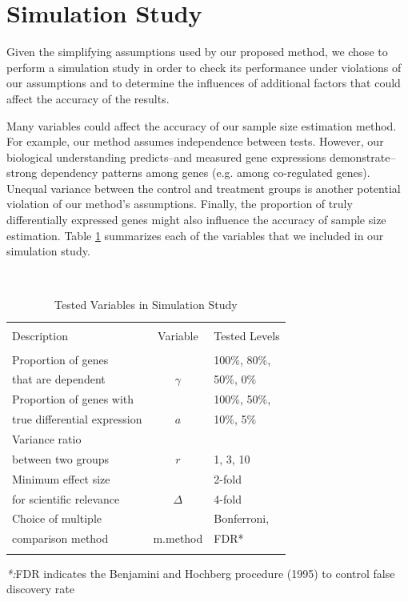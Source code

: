 \documentclass{bioinfo}
\begin{document}
\section{Simulation Study}

Given the simplifying assumptions used by our proposed method, we
chose to perform a simulation study in order to check its
performance under violations of our assumptions and to determine the
influences of additional factors that could affect the accuracy of
the results.

Many variables could affect the accuracy of our sample size
estimation method. For example, our method assumes independence
between tests. However, our biological understanding predicts--and
measured gene expressions demonstrate--strong dependency patterns
among genes (e.g. among co-regulated genes).  Unequal variance
between the control and treatment groups is another potential
violation of our method's assumptions. Finally, the proportion of
truly differentially expressed genes might also influence the
accuracy of sample size estimation.  Table
\ref{tb:SimuVariables} summarizes each of the variables that we
included in our simulation study.

\begin{table}\centering
  \caption{Tested Variables in Simulation Study}\ \\
  \begin{tabular}{lcl}
    \hline\hline
    \\
    Description & Variable & Tested Levels \\
    \\
    \hline\hline
    Proportion of genes &          & 100\%, 80\%,  \\
    that are dependent  & $\gamma$ & 50\%,   0\%    \\
    \hline
    Proportion of genes with     &     &  100\%, 50\%,\\
    true differential expression & $a$ &   10\%,  5\% \\
    \hline
    Variance ratio &  &\\
    between two groups & $r$ & 1, 3, 10  \\
    \hline
    Minimum effect size  & &2-fold \\
    for scientific relevance & $\Delta$ & 4-fold \\
    \hline
    Choice of multiple  & & Bonferroni,  \\
    comparison method & m.method & FDR* \\
    \hline\hline\\
  \end{tabular}
  \emph{*:}FDR indicates the Benjamini and Hochberg procedure (1995) to
    control false discovery rate
  \label{tb:SimuVariables}
\end{table}
\end{document}
